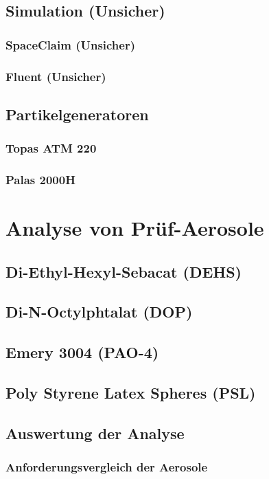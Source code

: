 \section{Simulation (Unsicher)}
\subsection{SpaceClaim (Unsicher)}
\subsection{Fluent (Unsicher)}

\section{Partikelgeneratoren}
\subsection{Topas ATM 220}
\subsection{Palas 2000H}


\chapter{Analyse von Pr\"{u}f-Aerosole}\label{ch:work}
\section{Di-Ethyl-Hexyl-Sebacat (DEHS)}
\section{Di-N-Octylphtalat (DOP)}
\section{Emery 3004 (PAO-4)}
\section{Poly Styrene Latex Spheres (PSL)}
\section{Auswertung der Analyse}
\subsection{Anforderungsvergleich der Aerosole}

